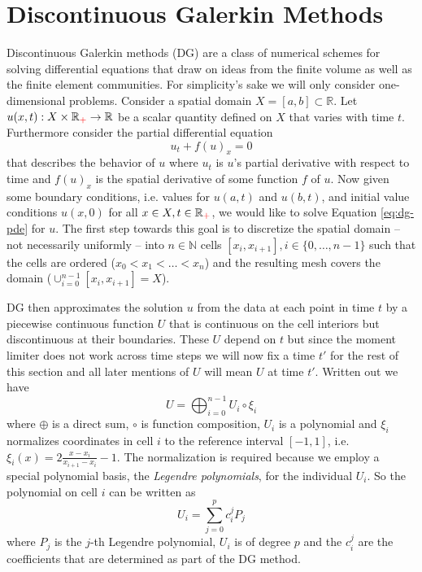 \section{Discontinuous Galerkin Methods}
\label{sec:dg}

Discontinuous Galerkin methods (DG) are a class of numerical schemes for solving differential equations that draw on ideas from the finite volume as well as the finite element communities.
For simplicity's sake we will only consider one-dimensional problems.
Consider a spatial domain $X = [a, b] \subset \mathbb{R}$.
Let $u(x, t) : X \times \mathbb{R}_{\textcolor{red}{+}} \rightarrow \mathbb{R}$ be a scalar quantity defined on $X$ that varies with time $t$.
Furthermore consider the partial differential equation
\begin{equation}
  \label{eq:dg-pde}
  u_{t} + f(u)_{x} = 0
\end{equation}
that describes the behavior of $u$ where $u_{t}$ is $u$'s partial derivative with respect to time and $f(u)_{x}$ is the spatial derivative of some function $f$ of $u$.
Now given some boundary conditions, i.e. values for $u(a, t)$ and $u(b, t)$, and initial value conditions $u(x, 0)$ for all $x \in X, t \in \mathbb{R}_{\textcolor{red}{+}}$, we would like to solve Equation \eqref{eq:dg-pde} for $u$.
The first step towards this goal is to discretize the spatial domain -- not necessarily uniformly -- into $n \in \mathbb{N}$ cells $[x_{i}, x_{i + 1}], i \in \{ 0, \dots, n - 1 \}$ such that the cells are ordered ($x_{0} < x_{1} < \dots < x_{n}$) and the resulting mesh covers the domain ($\cup_{i = 0}^{n - 1} [x_{i}, x_{i + 1}] = X$).

DG then approximates the solution $u$ from the data at each point in time $t$ by a piecewise continuous function $U$ that is continuous on the cell interiors but discontinuous at their boundaries.
These $U$ depend on $t$ but since the moment limiter does not work across time steps we will now fix a time $t'$ for the rest of this section and all later mentions of $U$ will mean $U$ at time $t'$.
Written out we have
\begin{equation*}
  U = \bigoplus_{i = 0}^{n - 1} U_{i} \circ \xi_{i}
\end{equation*}
where $\oplus$ is a direct sum, $\circ$ is function composition, $U_{i}$ is a polynomial and $\xi_{i}$ normalizes coordinates in cell $i$ to the reference interval $[-1, 1]$, i.e. $\xi_{i}(x) = 2 \frac{x - x_{i}}{x_{i + 1} - x_{i}} - 1$.
The normalization is required because we employ a special polynomial basis, the \emph{Legendre polynomials}, for the individual $U_{i}$.
So the polynomial on cell $i$ can be written as
\begin{equation*}
  U_{i} = \sum_{j = 0}^{p} c_{i}^{j} P_{j}
\end{equation*}
where $P_{j}$ is the $j$-th Legendre polynomial, $U_{i}$ is of degree $p$ and the $c_{i}^{j}$ are the coefficients that are determined as part of the DG method.

